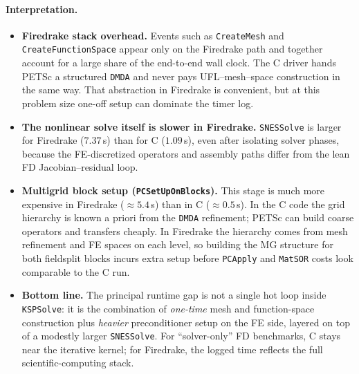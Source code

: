 \documentclass[11pt]{article}
\begin{document}
\paragraph{Interpretation.}
\begin{itemize}
  \item \textbf{Firedrake stack overhead.} Events such as \texttt{CreateMesh} and \texttt{CreateFunctionSpace} appear only on the Firedrake path and together account for a large share of the end-to-end wall clock. The C driver hands PETSc a structured \texttt{DMDA} and never pays UFL--mesh--space construction in the same way. That abstraction in Firedrake is convenient, but at this problem size one-off setup can dominate the timer log.
  \item \textbf{The nonlinear solve itself is slower in Firedrake.} \texttt{SNESSolve} is larger for Firedrake ($7.37$\,s) than for C ($1.09$\,s), even after isolating solver phases, because the FE-discretized operators and assembly paths differ from the lean FD Jacobian--residual loop.
  \item \textbf{Multigrid block setup (\texttt{PCSetUpOnBlocks}).} This stage is much more expensive in Firedrake ($\approx 5.4$\,s) than in C ($\approx 0.5$\,s). In the C code the grid hierarchy is known a priori from the \texttt{DMDA} refinement; PETSc can build coarse operators and transfers cheaply. In Firedrake the hierarchy comes from mesh refinement and FE spaces on each level, so building the MG structure for both fieldsplit blocks incurs extra setup before \texttt{PCApply} and \texttt{MatSOR} costs look comparable to the C run.
  \item \textbf{Bottom line.} The principal runtime gap is not a single hot loop inside \texttt{KSPSolve}: it is the combination of \emph{one-time} mesh and function-space construction plus \emph{heavier} preconditioner setup on the FE side, layered on top of a modestly larger \texttt{SNESSolve}. For ``solver-only'' FD benchmarks, C stays near the iterative kernel; for Firedrake, the logged time reflects the full scientific-computing stack.
\end{itemize}
\end{document}
